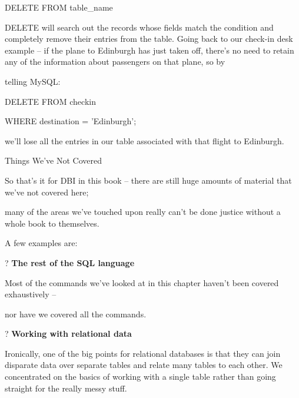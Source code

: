 \documentclass[a4paper,11pt]{book}
\begin{document}
\noindent 

\noindent DELETE FROM table\_name


\noindent 

\noindent DELETE will search out the records  whose  fields  match  the  condition  and  completely  remove  their entries from the table.  Going back  to  our  check-in  desk  example  --  if  the plane  to  Edinburgh  has  just taken off,  there's no  need to  retain  any  of the  information  about  passengers  on  that  plane,  so  by

\noindent telling MySQL:

\noindent 

\noindent 

\noindent DELETE FROM checkin

\noindent WHERE destination = 'Edinburgh';

\noindent 

\noindent we'll lose all the entries in our table associated with that flight to Edinburgh.

\noindent 

\noindent 

\noindent Things We've Not Covered

\noindent 

\noindent So that's it for DBI in this book -- there are still huge amounts of material that we've not covered here;

\noindent many of the areas we've touched upon really can't be done justice without a whole book to themselves.

\noindent A few examples are:

\noindent 

\noindent ? \textbf{The rest of the SQL language}

\noindent Most of the commands we've looked at in this chapter haven't been covered exhaustively --

\noindent nor have we covered all the commands.

\noindent 

\noindent ? \textbf{Working with relational data}

\noindent Ironically, one of the big points for relational databases is that they can join disparate data over separate tables and relate many tables to each other. We concentrated on the basics of working with a single table rather than going straight for the really messy stuff.

\noindent 
\end{document}

